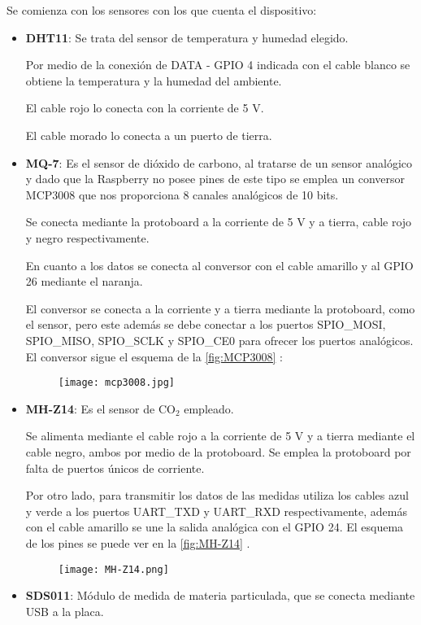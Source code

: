 Se comienza con los sensores con los que cuenta el dispositivo:
\begin{itemize}
	\item \textbf{DHT11}: Se trata del sensor de temperatura y humedad elegido.
	      
	      Por medio de la conexión de DATA - GPIO 4 indicada con el cable blanco se obtiene la temperatura y la humedad del ambiente. 
	      
	      El cable rojo lo conecta con la corriente de 5 V.
	      
	      El cable morado lo conecta a un puerto de tierra.
	\item \textbf{MQ-7}: Es el sensor de dióxido de carbono, al tratarse de un sensor analógico y dado que la Raspberry no posee pines de este tipo se emplea un conversor MCP3008 que nos proporciona 8 canales analógicos de 10 bits.
	      
	      Se conecta mediante la protoboard a la corriente de 5 V y a tierra, cable rojo y negro respectivamente.
	      
	      En cuanto a los datos se conecta al conversor con el cable amarillo y al GPIO 26 mediante el naranja.
	      
	      El conversor se conecta a la corriente y a tierra mediante la protoboard, como el sensor, pero este además se debe conectar a los puertos SPIO\_MOSI, SPIO\_MISO, SPIO\_SCLK y SPIO\_CE0 para ofrecer los puertos analógicos. El conversor sigue el esquema de la \autoref{fig:MCP3008} \cite{noauthor_27v_2008}:
	      \begin{figure}[H]
		      {\texttt{[image: mcp3008.jpg]}}
	      \end{figure}
	\item \textbf{MH-Z14}: Es el sensor de CO$_2$ empleado.
	      
	      Se alimenta mediante el cable rojo a la corriente de 5 V y a tierra mediante el cable negro, ambos por medio de la protoboard. Se emplea la protoboard por falta de puertos únicos de corriente.
	      
	      Por otro lado, para transmitir los datos de las medidas utiliza los cables azul y verde a los puertos UART\_TXD y UART\_RXD respectivamente, además con el cable amarillo se une la salida analógica con el GPIO 24. El esquema de los pines se puede ver en la \autoref{fig:MH-Z14} \cite{noauthor_documentacion_nodate}.
	      \begin{figure}[H]
		      {\texttt{[image: MH-Z14.png]}}
	      \end{figure}
	\item \textbf{SDS011}: Módulo de medida de materia particulada, que se conecta mediante USB a la placa.
\end{itemize}

